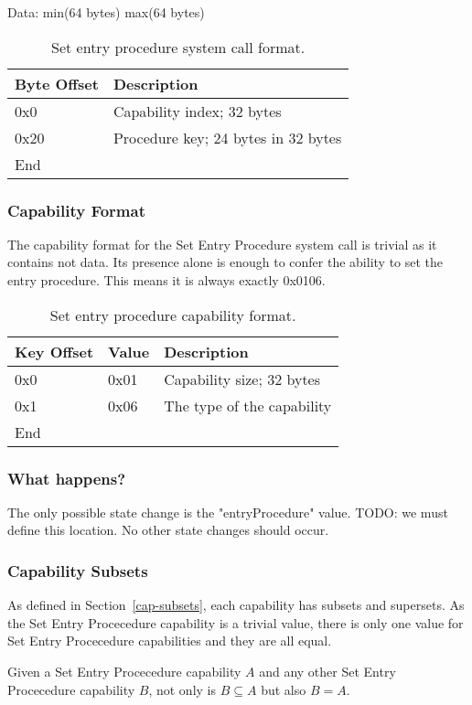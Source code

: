 \documentclass[english,a4paper]{article}
\let\oldparagraph\subsubsection
\renewcommand{\subsubsection}[1]{\oldparagraph{#1}\mbox{}}
\begin{document}
Data: min(64 bytes) max(64 bytes)

\begin{table}[H]
  \caption{Set entry procedure system call format.}
  \centering{}%
  \begin{tabular}{l|p{}}
    \hline
    Byte Offset & Description\tabularnewline
    \hline
    \hline
    0x0 & Capability index; 32 bytes \tabularnewline
    0x20 & Procedure key; 24 bytes in 32 bytes \tabularnewline
    \hline
    End &  \tabularnewline
    \hline
  \end{tabular}
\end{table}

\subsubsection{Capability Format}
The capability format for the Set Entry Procedure system call is trivial as it
contains not data. Its presence alone is enough to confer the ability to set the
entry procedure. This means it is always exactly 0x0106.

\begin{table}[H]
  \caption{Set entry procedure capability format.}
  \centering{}%
  \begin{tabular}{l|l|p{}}
    \hline
    Key Offset & Value & Description\tabularnewline
    \hline
    \hline
    0x0 & 0x01 & Capability size; 32 bytes \tabularnewline
    0x1 & 0x06 & The type of the capability \tabularnewline
    \hline
    End &  \tabularnewline
    \hline
  \end{tabular}
\end{table}

\subsubsection{What happens?}
The only possible state change is the "entryProcedure" value. TODO: we must
define this location. No other state changes should occur.

\subsubsection{Capability Subsets}
As defined in Section~\ref{cap-subsets}, each capability has subsets and
supersets. As the Set Entry Procecedure capability is a trivial value, there is
only one value for Set Entry Procecedure capabilities and they are all equal.

Given a Set Entry Procecedure capability $A$ and any other Set Entry Procecedure
capability $B$, not only is $B \subseteq A$ but also $B = A$.
\end{document}
